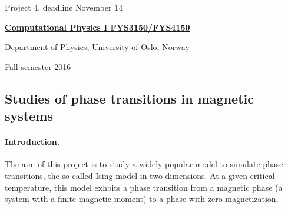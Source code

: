 \documentclass[%
oneside,                 %
final,                   %
10pt]{article}
\begin{document}

\newcommand{\exercisesection}[1]{\subsection*{#1}}






\thispagestyle{empty}

\begin{center}
{\LARGE\bf
\begin{spacing}{1.25}
Project 4, deadline  November 14
\end{spacing}
}
\end{center}


\begin{center}
{\bf \href{{http://www.uio.no/studier/emner/matnat/fys/FYS3150/index-eng.html}}{Computational Physics I FYS3150/FYS4150}}
\end{center}

    \begin{center}
\centerline{{\small Department of Physics, University of Oslo, Norway}}
\end{center}
    

\begin{center}
Fall semester 2016
\end{center}

\vspace{1cm}


\subsection*{Studies of phase transitions in magnetic systems}

\paragraph{Introduction.}
The aim of this project is to study a widely popular model to simulate phase transitions, the so-called Ising model in two dimensions. At a given critical temperature, this model exhbits a phase transition from a magnetic phase (a system with a finite magnetic moment) to a phase with zero magnetization. 
\end{document}
